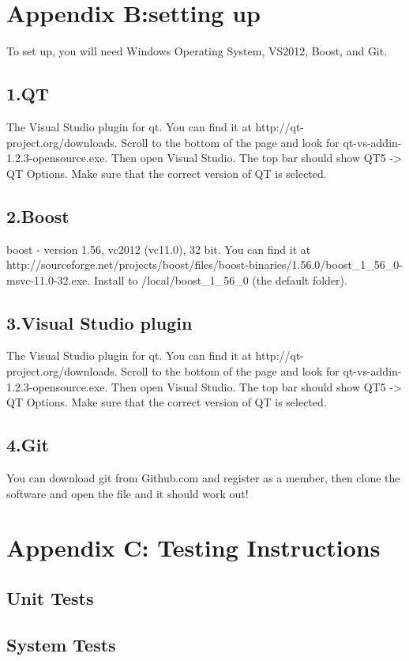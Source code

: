 \documentclass[12pt]{extarticle}
\begin{document}
\section{Appendix B:setting up}
To set up, you will need Windows Operating System, VS2012, Boost, and Git.
\subsection{1.QT}
The Visual Studio plugin for qt. You can find it at http://qt-project.org/downloads. 
Scroll to the bottom of the page and look for qt-vs-addin-1.2.3-opensource.exe. 
Then open Visual Studio. The top bar should show QT5 -> QT Options. Make 
sure that the correct version of QT is selected. 
\subsection{2.Boost}
boost - version 1.56, vc2012 (vc11.0), 32 bit. You can find it at 
http://sourceforge.net/projects/boost/files/boost-binaries/1.56.0/boost_1_56_0-
msvc-11.0-32.exe. Install to /local/boost_1_56_0 (the default folder). 
\subsection{3.Visual Studio plugin}
The Visual Studio plugin for qt. You can find it at http://qt-project.org/downloads. 
Scroll to the bottom of the page and look for qt-vs-addin-1.2.3-opensource.exe. 
Then open Visual Studio. The top bar should show QT5 -> QT Options. Make 
sure that the correct version of QT is selected. 
\subsection{4.Git}
You can download git from Github.com and register as a member, then clone the software and open the file and it should work out!

\section{Appendix C: Testing Instructions}
\subsection{Unit Tests}
\subsection{System Tests}
\end{document}
